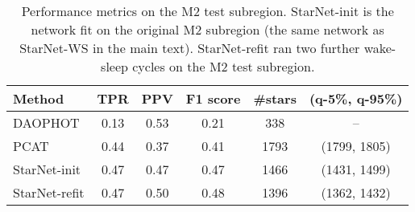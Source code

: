 \begin{table}[ht]
\centering
\caption{Performance metrics on the M2 test subregion. 
StarNet-init is the network fit on the original M2 subregion (the same network as StarNet-WS in the main text). 
StarNet-refit ran two further wake-sleep cycles on the M2 test subregion. }
\label{tab:summary_stats_m2test}
\begin{tabular}{l|ccc|cc}
\toprule
     Method &   TPR &   PPV &  F1 score &  \#stars & (q-5\%, q-95\%)\\
\midrule
    DAOPHOT &  0.13 &  0.53 &      0.21 &     338 & -- \\
       PCAT &  0.44 &  0.37 &      0.41 &    1793 & (1799, 1805)\\
 StarNet-init &  0.47 &  0.47 &      0.47 &    1466 & (1431, 1499)\\
 StarNet-refit &  0.47 &  0.50 &      0.48 &     1396 & (1362, 1432)\\
 \bottomrule
\end{tabular}
\end{table}
